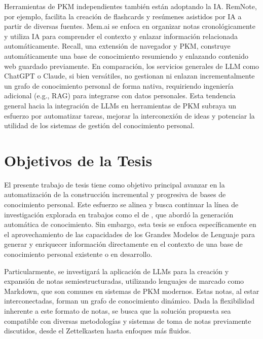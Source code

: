 Herramientas de PKM independientes también están adoptando la IA. RemNote, por ejemplo, facilita la creación de flashcards y resúmenes asistidos por IA a partir de diversas fuentes. Mem.ai se enfoca en organizar notas cronológicamente y utiliza IA para comprender el contexto y enlazar información relacionada automáticamente. Recall, una extensión de navegador y PKM, construye automáticamente una base de conocimiento resumiendo y enlazando contenido web guardado previamente. En comparación, los servicios generales de LLM como ChatGPT o Claude, si bien versátiles, no gestionan ni enlazan incrementalmente un grafo de conocimiento personal de forma nativa, requiriendo ingeniería adicional (e.g., RAG) para integrarse con datos personales. Esta tendencia general hacia la integración de LLMs en herramientas de PKM subraya un esfuerzo por automatizar tareas, mejorar la interconexión de ideas y potenciar la utilidad de los sistemas de gestión del conocimiento personal.

\section{Objetivos de la Tesis}
\label{sec:objetivos}
El presente trabajo de tesis tiene como objetivo principal avanzar en la automatización de la construcción incremental y progresiva de bases de conocimiento personal. Este esfuerzo se alinea y busca continuar la línea de investigación explorada en trabajos como el de \cite{fragaAutomaticGenerationKnowledge2023}, que abordó la generación automática de conocimiento. Sin embargo, esta tesis se enfoca específicamente en el aprovechamiento de las capacidades de los Grandes Modelos de Lenguaje para generar y enriquecer información directamente en el contexto de una base de conocimiento personal existente o en desarrollo.

Particularmente, se investigará la aplicación de LLMs para la creación y expansión de notas semiestructuradas, utilizando lenguajes de marcado como Markdown, que son comunes en sistemas de PKM modernos. Estas notas, al estar interconectadas, forman un grafo de conocimiento dinámico. Dada la flexibilidad inherente a este formato de notas, se busca que la solución propuesta sea compatible con diversas metodologías y sistemas de toma de notas previamente discutidos, desde el Zettelkasten hasta enfoques más fluidos.

